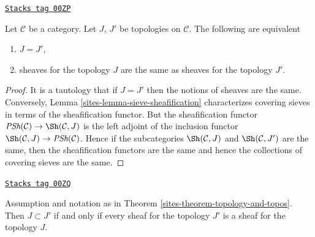 \begin{theorem}
\label{sites-theorem-topology-and-topos}
\href{https://stacks.math.columbia.edu/tag/00ZP}{\texttt{Stacks tag 00ZP}}

Let $\mathcal{C}$ be a category.
Let $J$, $J'$ be topologies on $\mathcal{C}$.
The following are equivalent
\begin{enumerate}
\item $J = J'$,
\item sheaves for the topology $J$ are the same as
sheaves for the topology $J'$.
\end{enumerate}
\end{theorem}

\begin{proof}

It is a tautology that if $J = J'$ then the notions of sheaves
are the same. Conversely, Lemma \ref{sites-lemma-sieve-sheafification}
characterizes covering sieves in terms of the sheafification
functor. But the sheafification functor
$\textit{PSh}(\mathcal{C}) \to \Sh(\mathcal{C}, J)$
is the left adjoint of the inclusion functor
$\Sh(\mathcal{C}, J) \to \textit{PSh}(\mathcal{C})$.
Hence if the subcategories
$\Sh(\mathcal{C}, J)$ and
$\Sh(\mathcal{C}, J')$ are the same, then the sheafification
functors are the same and hence the collections of covering
sieves are the same.
\end{proof}

\begin{lemma}
\label{sites-lemma-finer-topology}
\href{https://stacks.math.columbia.edu/tag/00ZQ}{\texttt{Stacks tag 00ZQ}}

Assumption and notation as in Theorem \ref{sites-theorem-topology-and-topos}.
Then $J \subset J'$ if and only if every sheaf for the
topology $J'$ is a sheaf for the topology $J$.
\end{lemma}

